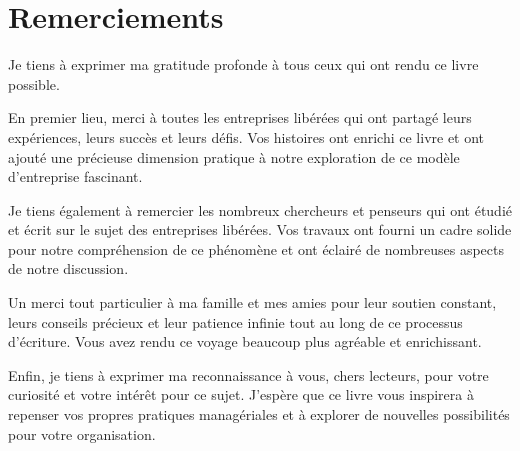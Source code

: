 \part*{Remerciements}
\markboth{}{}

Je tiens à exprimer ma gratitude profonde à tous ceux qui ont rendu ce livre possible.

En premier lieu, merci à toutes les entreprises libérées qui ont partagé leurs expériences, leurs succès et leurs défis. Vos histoires ont enrichi ce livre et ont ajouté une précieuse dimension pratique à notre exploration de ce modèle d'entreprise fascinant.

Je tiens également à remercier les nombreux chercheurs et penseurs qui ont étudié et écrit sur le sujet des entreprises libérées. Vos travaux ont fourni un cadre solide pour notre compréhension de ce phénomène et ont éclairé de nombreuses aspects de notre discussion.

Un merci tout particulier à ma famille et mes amies pour leur soutien constant, leurs conseils précieux et leur patience infinie tout au long de ce processus d'écriture. Vous avez rendu ce voyage beaucoup plus agréable et enrichissant.

Enfin, je tiens à exprimer ma reconnaissance à vous, chers lecteurs, pour votre curiosité et votre intérêt pour ce sujet. J'espère que ce livre vous inspirera à repenser vos propres pratiques managériales et à explorer de nouvelles possibilités pour votre organisation.
